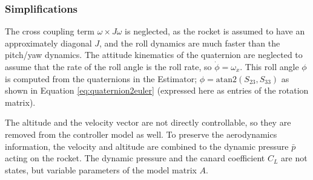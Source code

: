 \subsubsection{Simplifications}
The cross coupling term $\omega \times J \omega$ is neglected, as the rocket is assumed to have an approximately diagonal $J$, and the roll dynamics are much faster than the pitch/yaw dynamics. 
The attitude kinematics of the quaternion are neglected to assume that the rate of the roll angle is the roll rate, so $\dot \phi = \omega_x$.
This roll angle $\phi$ is computed from the quaternions in the Estimator; $\phi = \mathrm{atan2}( S_{23}, S_{33} )$ as shown in Equation \ref{eq:quaternion2euler} (expressed here as entries of the rotation matrix).

The altitude and the velocity vector are not directly controllable, so they are removed from the controller model as well. 
To preserve the aerodynamics information, the velocity and altitude are combined to the dynamic pressure $\bar p$ acting on the rocket. 
The dynamic pressure and the canard coefficient $C_L$ are not states, but variable parameters of the model matrix $A$.

